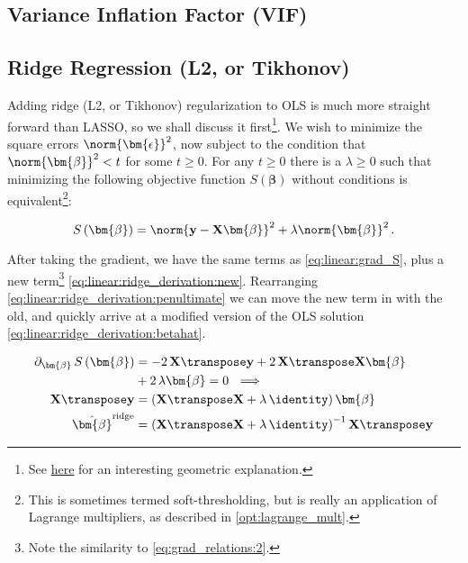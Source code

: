 \subsection{Variance Inflation Factor (VIF)}
\label{regression:linear:VIF}

\subsection{Ridge Regression (L2, or Tikhonov)}
\label{regression:linear:ridge}

Adding ridge (L2, or Tikhonov) regularization to OLS is much more straight forward than LASSO,
so we shall discuss it first\footnote{See \href{https://stats.stackexchange.com/a/164546}{here} for an interesting geometric explanation.}.
We wish to minimize the square errors $\norm{\bm{\epsilon}}^{2}$,
now subject to the condition that $\norm{\bm{\beta}}^{2} < t$ for some $t \geq 0$.
For any $t \geq 0$ there is a $\lambda \geq 0$ such that minimizing the following
objective function $S\left(\bm{\beta}\right)$ without conditions is
equivalent\footnote{This is sometimes termed soft-thresholding, but is really an application of Lagrange multipliers, as described in \cref{opt:lagrange_mult}.}:

\begin{equation} \label{eq:linear:ridge}
S\left(\bm{\beta}\right) = \norm{\mathbf{y} - \mathbf{X} \bm{\beta}}^{2} + \lambda \norm{\bm{\beta}}^{2}\,.
\end{equation}

After taking the gradient, we have the same terms as \cref{eq:linear:grad_S},
plus a new term\footnote{Note the similarity to \cref{eq:grad_relations:2}.} \cref{eq:linear:ridge_derivation:new}.
Rearranging \cref{eq:linear:ridge_derivation:penultimate} we can move the new term in with the old,
and quickly arrive at a modified version of the OLS solution \cref{eq:linear:ridge_derivation:betahat}.

\begin{subequations} \label{eq:linear:ridge_derivation}
\begin{align}
\partial_{\bm{\beta}} \, S\left(\bm{\beta}\right)
&= -2\, \mathbf{X}\transpose \mathbf{y} + 2\, \mathbf{X}\transpose \mathbf{X} \bm{\beta} \label{eq:linear:ridge_derivation:grad_S_repeat} \\
&+ 2\,\lambda \bm{\beta} = 0 \,\, \implies \label{eq:linear:ridge_derivation:new} \\
\mathbf{X}\transpose \mathbf{y} &= \left(\mathbf{X}\transpose \mathbf{X} + \lambda\,\identity\right) \bm{\beta} \label{eq:linear:ridge_derivation:penultimate} \\
\hat{\bm{\beta}}^{\text{ridge}} &= \left(\mathbf{X}\transpose\mathbf{X} + \lambda\,\identity\right)^{-1}\mathbf{X}\transpose \mathbf{y} \label{eq:linear:ridge_derivation:betahat}
\end{align}
\end{subequations}

